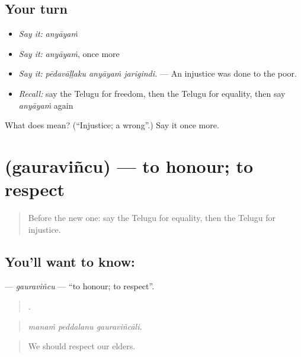 \subsection*{Your turn}
\begin{itemize}
\raggedright
  \item \emph{Say it:} \emph{anyāyaṁ}
  \item \emph{Say it:} \emph{anyāyaṁ}, once more
  \item \emph{Say it:} \emph{pēdavāḷḷaku anyāyaṁ jarigindi.} — An injustice was done to the poor.
  \item \emph{Recall:} say the Telugu for freedom, then the Telugu for equality, then say \emph{anyāyaṁ} again
\end{itemize}

\begin{tcolorbox}[breakable,colback=teal!4,colframe=teal!35!black,title={Before you move on}]
What does  mean? (\textquotedblleft{}Injustice; a wrong\textquotedblright{}.) Say it once more.
\end{tcolorbox}
\section[\texorpdfstring{\te{గౌరవించు} (gauraviñcu)}{గౌరవించు (gauraviñcu)}]{ (gauraviñcu) — to honour; to respect}

\label{lesson:TE-C399-gauravincu}



\begin{quote}
Before the new one: say the Telugu for equality, then the Telugu for injustice.
\end{quote}

\subsection*{You'll want to know: }
\textbf{} — \emph{gauraviñcu} — \textquotedblleft{}to honour; to respect\textquotedblright{}.

\begin{quote}
  .
\end{quote}

\begin{quote}
\emph{manaṁ peddalanu gauraviñcāli.}
\end{quote}

\begin{quote}
We should respect our elders.
\end{quote}

